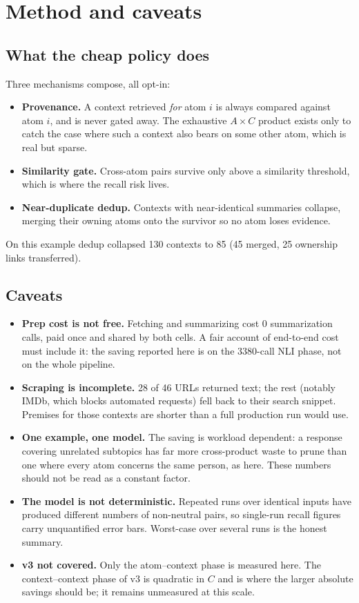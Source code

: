 \documentclass[11pt]{article}
\begin{document}
\section{Method and caveats}
\subsection{What the cheap policy does}
Three mechanisms compose, all opt-in:
\begin{itemize}
  \item \textbf{Provenance.} A context retrieved \emph{for} atom $i$ is always compared against atom $i$, and is never gated away. The exhaustive $A \times C$ product exists only to catch the case where such a context also bears on some other atom, which is real but sparse.
  \item \textbf{Similarity gate.} Cross-atom pairs survive only above a similarity threshold, which is where the recall risk lives.
  \item \textbf{Near-duplicate dedup.} Contexts with near-identical summaries collapse, merging their owning atoms onto the survivor so no atom loses evidence.
\end{itemize}

On this example dedup collapsed 130 contexts to 85 (45 merged, 25 ownership links transferred).

\subsection{Caveats}
\begin{itemize}
  \item \textbf{Prep cost is not free.} Fetching and summarizing cost 0 summarization calls, paid once and shared by both cells. A fair account of end-to-end cost must include it: the saving reported here is on the 3380-call NLI phase, not on the whole pipeline.
  \item \textbf{Scraping is incomplete.} 28 of 46 URLs returned text; the rest (notably IMDb, which blocks automated requests) fell back to their search snippet. Premises for those contexts are shorter than a full production run would use.
  \item \textbf{One example, one model.} The saving is workload dependent: a response covering unrelated subtopics has far more cross-product waste to prune than one where every atom concerns the same person, as here. These numbers should not be read as a constant factor.
  \item \textbf{The model is not deterministic.} Repeated runs over identical inputs have produced different numbers of non-neutral pairs, so single-run recall figures carry unquantified error bars. Worst-case over several runs is the honest summary.
  \item \textbf{v3 not covered.} Only the atom--context phase is measured here. The context--context phase of v3 is quadratic in $C$ and is where the larger absolute savings should be; it remains unmeasured at this scale.
\end{itemize}
\end{document}
